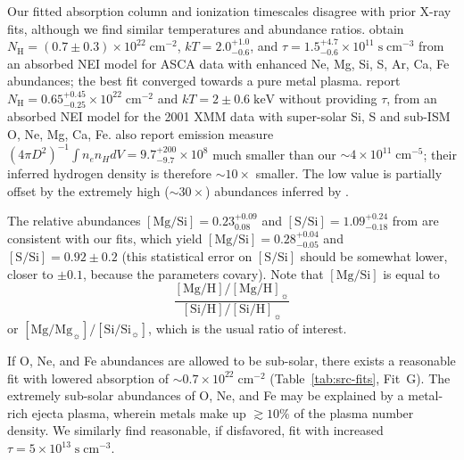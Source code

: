 \documentclass[preprint2,tighten,trackchanges]{aastex6}
\newcommand*{\mt}{\mathrm}
\newcommand*{\unit}[1]{\;\mt{#1}}  %
\newcommand*{\abt}{\mathord{\sim}} %
\newcommand*{\nH}{N_{\mathrm{H}}}
\newcommand*{\nHUnits}{\times 10^{22} \unit{cm^{-2}}}
\newcommand*{\TauUnits}{\unit{s\;cm^{-3}}}
\newcommand*{\kB}{k}  %
\begin{document}
Our fitted absorption column and ionization timescales disagree with prior
X-ray fits, although we find similar temperatures and abundance ratios.
\citet{rakowski2001} obtain $\nH = (0.7 \pm 0.3) \nHUnits$,
$\kB T = 2.0^{+1.0}_{-0.6}$, and
$\tau = 1.5^{+4.7}_{-0.6} \times 10^{11} \unit{s\;cm^{-3}}$
from an absorbed NEI model for ASCA data with enhanced Ne, Mg, Si, S, Ar, Ca,
Fe abundances; the best fit converged towards a pure metal plasma.
\citet{safi-harb2007} report $\nH = 0.65^{+0.45}_{-0.25} \nHUnits$
and $\kB T = 2 \pm 0.6 \unit{keV}$ without providing $\tau$, from
an absorbed NEI model for the 2001 XMM data with
super-solar Si, S and sub-ISM O, Ne, Mg, Ca, Fe.
\citet{rakowski2001} also report emission measure
$(4\pi D^2)^{-1} \int n_e n_H dV = 9.7^{+200}_{-9.7} \times 10^8$ much smaller
than our $\abt 4 \times 10^{11} \unit{cm^{-5}}$; their inferred hydrogen
density is therefore $\abt 10\times$ smaller.
The low value is partially offset by the extremely high ($\abt 30\times$)
abundances inferred by \citet{rakowski2001}.

The relative abundances
  $[\mt{Mg}/\mt{Si}] = 0.23^{+0.09}_{0.08}$ and
  $[\mt{S}/\mt{Si}] = 1.09^{+0.24}_{-0.18}$ from \citet{rakowski2001}
are consistent with our fits, which yield $[\mt{Mg}/\mt{Si}] = 0.28^{+0.04}_{-0.05}$
and $[\mt{S}/\mt{Si}] = 0.92 \pm 0.2$ (this statistical error on
$[\mt{S}/\mt{Si}]$ should be somewhat lower, closer to $\pm 0.1$, because the
parameters covary).
Note that $[\mt{Mg}/\mt{Si}]$ is equal to
\[
    \frac{[\mt{Mg}/\mt{H}] / [\mt{Mg}/\mt{H}]_{\sun}}
         {[\mt{Si}/\mt{H}] / [\mt{Si}/\mt{H}]_{\sun}}
\]
or $[\mt{Mg}/\mt{Mg}_{\sun}] / [\mt{Si}/\mt{Si}_{\sun}]$,
which is the usual ratio of interest.


If O, Ne, and Fe abundances are allowed to be sub-solar, there exists a
reasonable fit with lowered absorption of $\abt 0.7 \nHUnits$
(Table~\ref{tab:src-fits}, Fit~G).
The extremely sub-solar abundances of O, Ne, and Fe may be explained by a
metal-rich ejecta plasma, wherein metals make up $\gtrsim 10\%$ of the plasma
number density.
We similarly find reasonable, if disfavored, fit with increased $\tau = 5
\times 10^{13} \TauUnits$.
\end{document}
